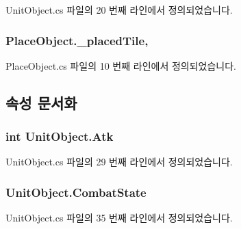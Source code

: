 Unit\+Object.\+cs 파일의 20 번째 라인에서 정의되었습니다.

\subsubsection[{\texorpdfstring{\+\_\+placed\+Tile}{_placedTile}}]{ Place\+Object.\+\_\+placed\+Tile\hspace{0.3cm}{\ttfamily [protected]}, {\ttfamily [inherited]}}\hypertarget{class_place_object_a2006d9f7ffcf8aba6f731ebfc9b0af35}{}\label{class_place_object_a2006d9f7ffcf8aba6f731ebfc9b0af35}


Place\+Object.\+cs 파일의 10 번째 라인에서 정의되었습니다.



\subsection{속성 문서화}
\subsubsection[{\texorpdfstring{Atk}{Atk}}]{\setlength{\rightskip}{0pt plus 5cm}int Unit\+Object.\+Atk\hspace{0.3cm}{\ttfamily [get]}}\hypertarget{class_unit_object_a39c41a2a1ba683b02a265594abad9684}{}\label{class_unit_object_a39c41a2a1ba683b02a265594abad9684}


Unit\+Object.\+cs 파일의 29 번째 라인에서 정의되었습니다.

\subsubsection[{\texorpdfstring{Combat\+State}{CombatState}}]{ Unit\+Object.\+Combat\+State\hspace{0.3cm}{\ttfamily [get]}}\hypertarget{class_unit_object_a2e807fb19c32a7d2bd16d86297e7a7fa}{}\label{class_unit_object_a2e807fb19c32a7d2bd16d86297e7a7fa}


Unit\+Object.\+cs 파일의 35 번째 라인에서 정의되었습니다.

